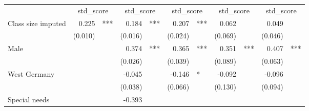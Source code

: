 \documentclass{article}
\begin{document}
\begin{table}[!h]
\centering
\begin{tabular}{lllllllllll}
\cline{1-11}
\multicolumn{1}{r}{} &
  \multicolumn{2}{c}{std\_score} &
  \multicolumn{2}{c}{std\_score} &
  \multicolumn{2}{c}{std\_score} &
  \multicolumn{2}{c}{std\_score} &
  \multicolumn{2}{c}{std\_score} \\
\cline{1-11}
\multicolumn{1}{l}{Class size imputed} &
  \multicolumn{1}{r}{0.225} &
  \multicolumn{1}{l}{***} &
  \multicolumn{1}{r}{0.184} &
  \multicolumn{1}{l}{***} &
  \multicolumn{1}{r}{0.207} &
  \multicolumn{1}{l}{***} &
  \multicolumn{1}{r}{0.062} &
  \multicolumn{1}{l}{} &
  \multicolumn{1}{r}{0.049} &
  \multicolumn{1}{l}{} \\
\multicolumn{1}{l}{} &
  \multicolumn{1}{r}{(0.010)} &
  \multicolumn{1}{l}{} &
  \multicolumn{1}{r}{(0.016)} &
  \multicolumn{1}{l}{} &
  \multicolumn{1}{r}{(0.024)} &
  \multicolumn{1}{l}{} &
  \multicolumn{1}{r}{(0.069)} &
  \multicolumn{1}{l}{} &
  \multicolumn{1}{r}{(0.046)} &
  \multicolumn{1}{l}{} \\
\multicolumn{1}{l}{Male} &
  \multicolumn{1}{r}{} &
  \multicolumn{1}{l}{} &
  \multicolumn{1}{r}{0.374} &
  \multicolumn{1}{l}{***} &
  \multicolumn{1}{r}{0.365} &
  \multicolumn{1}{l}{***} &
  \multicolumn{1}{r}{0.351} &
  \multicolumn{1}{l}{***} &
  \multicolumn{1}{r}{0.407} &
  \multicolumn{1}{l}{***} \\
\multicolumn{1}{l}{} &
  \multicolumn{1}{r}{} &
  \multicolumn{1}{l}{} &
  \multicolumn{1}{r}{(0.026)} &
  \multicolumn{1}{l}{} &
  \multicolumn{1}{r}{(0.039)} &
  \multicolumn{1}{l}{} &
  \multicolumn{1}{r}{(0.089)} &
  \multicolumn{1}{l}{} &
  \multicolumn{1}{r}{(0.063)} &
  \multicolumn{1}{l}{} \\
\multicolumn{1}{l}{West Germany} &
  \multicolumn{1}{r}{} &
  \multicolumn{1}{l}{} &
  \multicolumn{1}{r}{-0.045} &
  \multicolumn{1}{l}{} &
  \multicolumn{1}{r}{-0.146} &
  \multicolumn{1}{l}{*} &
  \multicolumn{1}{r}{-0.092} &
  \multicolumn{1}{l}{} &
  \multicolumn{1}{r}{-0.096} &
  \multicolumn{1}{l}{} \\
\multicolumn{1}{l}{} &
  \multicolumn{1}{r}{} &
  \multicolumn{1}{l}{} &
  \multicolumn{1}{r}{(0.038)} &
  \multicolumn{1}{l}{} &
  \multicolumn{1}{r}{(0.066)} &
  \multicolumn{1}{l}{} &
  \multicolumn{1}{r}{(0.130)} &
  \multicolumn{1}{l}{} &
  \multicolumn{1}{r}{(0.094)} &
  \multicolumn{1}{l}{} \\
\multicolumn{1}{l}{Special needs} &
  \multicolumn{1}{r}{} &
  \multicolumn{1}{l}{} &
  \multicolumn{1}{r}{-0.393} &

\end{tabular}
\end{table}
\end{document}
